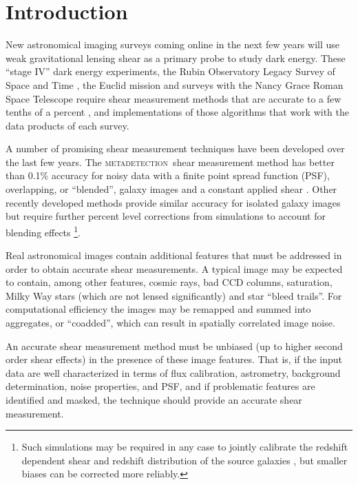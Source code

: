 \documentclass[twocolumn,twocolappendix,astrosym]{openjournal}
\newcommand{\mdet}{\textsc{metadetection}}
\begin{document}
\section{Introduction} \label{sec:intro}

New astronomical imaging surveys coming online in the next few years will use
weak gravitational lensing shear as a primary probe to study dark energy.
These ``stage IV'' dark energy experiments, the Rubin Observatory Legacy Survey
of Space and Time \citep[LSST,][]{IvezicLSST2008}, the Euclid mission
\citep{Euclid2011} and surveys with the Nancy Grace Roman Space Telescope
\citep{Roman2015} require shear measurement methods that are accurate to a few
tenths of a percent \citep{Massey2013,SRD}, and implementations of those
algorithms that work with the data products of each survey.

A number of promising shear measurement techniques have been developed over the
last few years.  The \mdet\ shear measurement method \citep{mdet20} has better
than 0.1\% accuracy for noisy data with a finite point spread function (PSF),
overlapping, or ``blended'', galaxy images and a constant applied shear
\citep{mdet20,HoekstraMdet2021a,HoekstraMdet2021b}.  Other recently developed
methods provide similar accuracy for isolated galaxy images \citep{BernBFD2016,
LiFPFSBlending2022} but require further percent level corrections from
simulations to account for blending effects
\citep{mdet20,LiFPFSBlending2022}\footnote{Such simulations may be required in
any case to jointly calibrate the redshift dependent shear and redshift
distribution of the source galaxies \citep{MacCrann2022,LiNofz2022}, but
smaller biases can be corrected more reliably.}.

Real astronomical images contain additional features that must be addressed in
order to obtain accurate shear measurements.  A typical image may be expected
to contain, among other features, cosmic rays, bad CCD columns, saturation,
Milky Way stars (which are not lensed significantly) and star ``bleed trails''.
For computational efficiency the images may be remapped and summed into
aggregates, or ``coadded'', which can result in spatially correlated image
noise.

An accurate shear measurement method must be unbiased (up to higher second
order shear effects) in the presence of these image features.  That is, if the
input data are well characterized in terms of flux calibration, astrometry,
background determination, noise properties, and PSF, and if problematic
features are identified and masked, the technique should provide an accurate
shear measurement.
\end{document}
